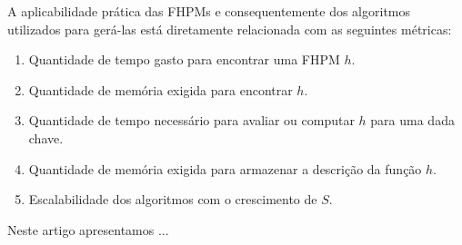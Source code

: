 A aplicabilidade pr\'atica das FHPMs e consequentemente dos algoritmos utilizados para ger\'a-las est\'a diretamente relacionada com as seguintes m\'etricas:
\begin{enumerate}
\item Quantidade de tempo gasto para encontrar uma FHPM $h$.
\item Quantidade de mem\'oria exigida para encontrar $h$.  
\item Quantidade de tempo necess\'ario para avaliar ou computar $h$ para uma dada chave.
\item Quantidade de mem\'oria exigida para armazenar a descri\c{c}\~ao da fun\c{c}\~ao $h$.
\item Escalabilidade dos algoritmos com o crescimento de $S$. 
\end{enumerate}

Neste artigo apresentamos ...
